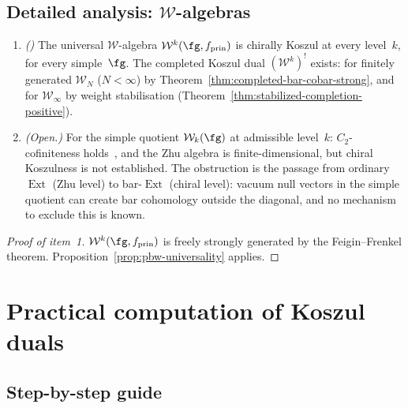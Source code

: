 \subsection{Detailed analysis: $\mathcal{W}$-algebras}

\begin{proposition}\label{prop:w-algebra-koszul}
\begin{enumerate}
\item\emph{(\ClaimStatusProvedHere)}
The universal $\mathcal{W}$-algebra $\mathcal{W}^k(\fg, f_{\mathrm{prin}})$
is chirally Koszul at every level~$k$, for every simple~$\fg$.
The completed Koszul dual $(\mathcal{W}^k)^!$ exists: for finitely generated
$\mathcal{W}_N$ ($N < \infty$) by
Theorem~\textup{\ref{thm:completed-bar-cobar-strong}}, and for
$\mathcal{W}_\infty$ by weight stabilisation
(Theorem~\textup{\ref{thm:stabilized-completion-positive}}).

\item\emph{(Open.)}
For the simple quotient $\mathcal{W}_k(\fg)$ at admissible level~$k$:
$C_2$-cofiniteness holds~\cite{Arakawa15}, and the Zhu algebra is
finite-dimensional, but chiral Koszulness is not established.
The obstruction is the passage from ordinary $\operatorname{Ext}$
(Zhu level) to bar-$\operatorname{Ext}$ (chiral level): vacuum null
vectors in the simple quotient can create bar cohomology outside
the diagonal, and no mechanism to exclude this is known.
\end{enumerate}
\end{proposition}

\begin{proof}[Proof of item~\textup{1}]
$\mathcal{W}^k(\fg, f_{\mathrm{prin}})$ is freely strongly generated
by the Feigin--Frenkel theorem.
Proposition~\ref{prop:pbw-universality} applies.
\end{proof}


\section{Practical computation of Koszul duals}
\label{sec:practical-computation}

\subsection{Step-by-step guide}

